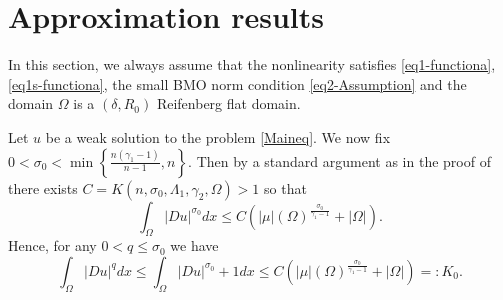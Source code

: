 \documentclass[a4paper,10pt]{amsart}
\newtheorem{thm}{Theorem}[section]
\newcommand{\pd}{p(\cdot)}
\newcommand{\px}{p(x)}
\newcommand{\f}{\frac}
\newcommand{\Om}{\Omega}
\newcommand{\di}{{\rm div}}
\begin{document}



\section{Approximation results}
In this section, we always assume that the nonlinearity satisfies \eqref{eq1-functiona}, \eqref{eq1s-functiona}, the small BMO norm condition \eqref{eq2-Assumption}  and the domain $\Om$ is a $(\delta, R_0)$ Reifenberg flat domain.

Let $u$ be a weak solution to the problem \eqref{Maineq}. We now fix $0<\sigma_0<\min\left\{\f{n(\gamma_1-1)}{n-1},n\right\}$. Then by a standard argument as in the proof of \cite[Theorem 1]{BG} there exists $C=K(n,\sigma_0,\Lambda_1, \gamma_2, \Om)>1$ so that 
\begin{equation*}
\int_{\Om}|Du|^{\sigma_0} dx  \leq C(|\mu|(\Om)^{\f{\sigma_0}{\gamma_1-1}}+|\Om|).
\end{equation*}
Hence, for any $0<q\leq \sigma_0$ we have
\begin{equation}\label{bounds-Du}
\int_{\Om}|Du|^{q} dx\leq \int_{\Om}|Du|^{\sigma_0}+1 dx  \leq C(|\mu|(\Om)^{\f{\sigma_0}{\gamma_1-1}}+|\Om|)=:K_0.
\end{equation}
\end{document}
